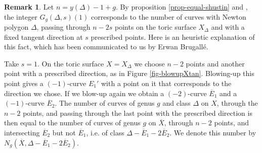 \documentclass[11pt]{article}
\theoremstyle{definition}
\newtheorem{rema}[theo]{Remark}
\numberwithin{equation}{section}
\theoremstyle{plain}
\begin{document}
\begin{rema}
Let $n = y(\Delta)-1+g$. By proposition \ref{prop-equal-shustin} and \cite[Corollary 5.11]{shustin-2024-refined}, the integer $G_g(\Delta,s)(1)$ corresponds to the number of curves with Newton polygon $\Delta$, passing through $n-2s$ points on the toric surface $X_\Delta$ and with a fixed tangent direction at $s$ prescribed points. 
Here is an heuristic explanation of this fact, which has been communicated to us by Erwan Brugallé.

Take $s=1$. On the toric surface $X=X_\Delta$ we choose $n-2$ points and another point with a prescribed direction, as in Figure \ref{fig-blowupXtan}. Blowing-up this point gives a $(-1)$-curve $E_1'$ with a point on it that corresponds to the direction we chose. If we blow-up again we obtain a $(-2)$-curve $\overline E_1$ and a $(-1)$-curve $\overline E_2$. The number of curves of genus $g$ and class $\Delta$ on $X$, through the $n-2$ points, and passing through the last point with the prescribed direction is then equal to the number of curves  of genus $g$ on $\overline X$, through $n-2$ points, and intersecting $\overline E_2$ but not $\overline E_1$, i.e.  of class $\Delta-\overline E_1 - 2\overline E_2$. We denote this number by $N_g(\overline X,\Delta- \overline E_1 - 2\overline E_2)$.

\begin{figure}[ht]
	\centering
{}
\end{figure}
\end{rema}
\end{document}
